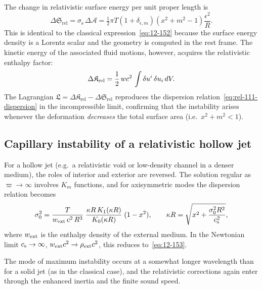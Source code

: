 The change in relativistic surface energy per unit proper length is
\begin{equation}
\label{eq:rel-111-DeltaS}
\Delta\mathfrak{S}_{\mathrm{rel}} = \sigma_{\mathrm{s}}\,
  \Delta\mathcal{A}
  = \tfrac{1}{2}\pi T(1+\delta_{\epsilon,m})
  (x^{2}+m^{2}-1)\frac{\epsilon^{2}}{R}.
\end{equation}
This is identical to the classical expression~\eqref{eq:12-152}
because the surface energy density is a Lorentz scalar and the
geometry is computed in the rest frame.  The kinetic energy of the
associated fluid motions, however, acquires the relativistic
enthalpy factor:
\begin{equation}
\label{eq:rel-111-KE}
\Delta\mathfrak{K}_{\mathrm{rel}} =
  \frac{1}{2}\,w c^{2}\,
  \int \delta u^{i}\,\delta u_{i}\,dV.
\end{equation}
The Lagrangian
$\mathfrak{L} = \Delta\mathfrak{K}_{\mathrm{rel}}
- \Delta\mathfrak{S}_{\mathrm{rel}}$ reproduces the dispersion
relation~\eqref{eq:rel-111-dispersion} in the
incompressible limit, confirming that the instability arises
whenever the deformation \emph{decreases} the total surface area
(i.e.\ $x^{2}+m^{2} < 1$).

\subsection{Capillary instability of a relativistic hollow jet}
\label{sec:rel-111-hollow}

For a hollow jet (e.g.\ a relativistic void or low-density channel
in a denser medium), the roles of interior and exterior are reversed.
The solution regular as $\varpi \to \infty$ involves $K_{m}$
functions, and for axisymmetric modes the dispersion relation becomes
\begin{equation}
\label{eq:rel-111-hollow-disp}
\sigma_{0}^{2} = \frac{T}{w_{\mathrm{ext}}\,c^{2}\,R^{3}}\;
  \frac{\kappa R\,K_{1}(\kappa R)}{K_{0}(\kappa R)}\;(1 - x^{2}),
\qquad
\kappa R = \sqrt{x^{2}
  + \frac{\sigma_{0}^{2}R^{2}}{c_{\mathrm{s}}^{2}}},
\end{equation}
where $w_{\mathrm{ext}}$ is the enthalpy density of the
external medium.  In the Newtonian limit
$c_{\mathrm{s}} \to \infty$, $w_{\mathrm{ext}}c^{2} \to \rho_{\mathrm{ext}}c^{2}$,
this reduces to~\eqref{eq:12-153}.

The mode of maximum instability occurs at a somewhat longer
wavelength than for a solid jet (as in the classical case), and the
relativistic corrections again enter through the enhanced inertia
and the finite sound speed.

